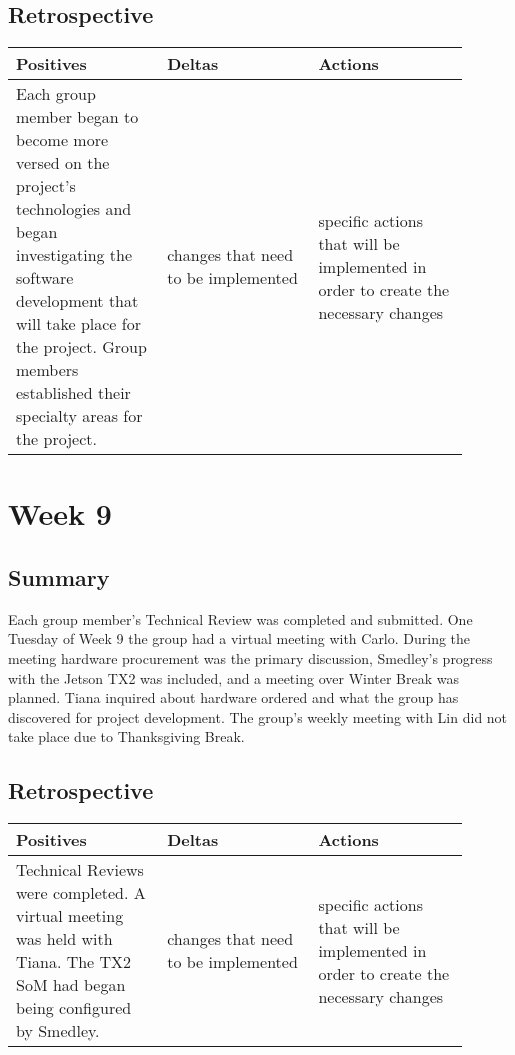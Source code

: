 \documentclass[letterpaper,10pt,serif,draftclsnofoot,onecolumn,compsoc,titlepage]{IEEEtran}
\begin{document}
\subsection{Retrospective}

\begin{tabular}{|p{0.3\linewidth}|p{0.3\linewidth}|p{0.3\linewidth}|}
   \hline
   \textbf{Positives} & \textbf{Deltas} & \textbf{Actions}\\ 
   \hline
   Each group member began to become more versed on the project's technologies and 
   began investigating the software development that will take place for the project. 
   Group members established their specialty areas for the project.  
   & 
   changes that need to be implemented 
   & 
   specific actions that will be implemented in order to create the necessary 
   changes \\
   \hline
\end{tabular}

\section{Week 9}

\subsection{Summary}

Each group member's Technical Review was completed and submitted. One Tuesday of Week 
9 the group had a virtual meeting with Carlo. During the meeting hardware procurement 
was the primary discussion, Smedley's progress with the Jetson TX2 was included, and 
a meeting over Winter Break was planned. Tiana inquired about hardware ordered and 
what the group has discovered for project development. The group's weekly meeting with 
Lin did not take place due to Thanksgiving Break. \\

\subsection{Retrospective}

\begin{tabular}{|p{0.3\linewidth}|p{0.3\linewidth}|p{0.3\linewidth}|}
   \hline
   \textbf{Positives} & \textbf{Deltas} & \textbf{Actions}\\ 
   \hline
   Technical Reviews were completed. A virtual meeting was held with Tiana. The 
   TX2 SoM had began being configured by Smedley.  
   & 
   changes that need to be implemented 
   & 
   specific actions that will be implemented in order to create the necessary 
   changes \\
   \hline
\end{tabular}
\end{document}
